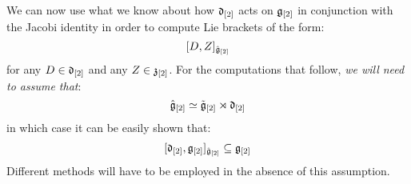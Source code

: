             \begin{remark} \label{remark: derivation_action_on_toroidal_centres}
                We can now use what we know about how $\mathfrak{d}_{[2]}$ acts on $\mathfrak{g}_{[2]}$ in conjunction with the Jacobi identity in order to compute Lie brackets of the form:
                    $$[D, Z]_{\hat{\mathfrak{g}}_{[2]}}$$
                for any $D \in \mathfrak{d}_{[2]}$ and any $Z \in \mathfrak{z}_{[2]}$. For the computations that follow, \textit{we will need to assume that}:
                    $$\hat{\mathfrak{g}}_{[2]} \simeq \tilde{\mathfrak{g}}_{[2]}\rtimes \mathfrak{d}_{[2]}$$
                in which case it can be easily shown that:
                    $$[\mathfrak{d}_{[2]}, \mathfrak{g}_{[2]}]_{\hat{\mathfrak{g}}_{[2]}} \subseteq \mathfrak{g}_{[2]}$$
                Different methods will have to be employed in the absence of this assumption.


\end{remark}
